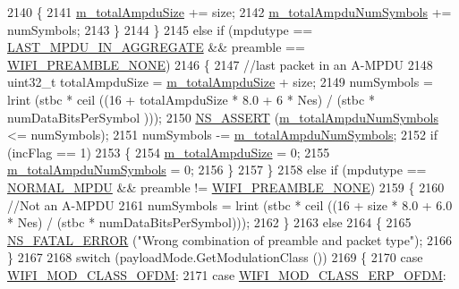 \begin{DoxyCode}
2140         \{
2141           \hyperlink{classns3_1_1WifiPhy_a33881bc9adbd2f0fa397fa6d5a44365f}{m\_totalAmpduSize} += size;
2142           \hyperlink{classns3_1_1WifiPhy_aef81821222be314fe60d1b1827b1397f}{m\_totalAmpduNumSymbols} += numSymbols;
2143         \}
2144     \}
2145   \textcolor{keywordflow}{else} \textcolor{keywordflow}{if} (mpdutype == \hyperlink{namespacens3_ae617d41bbd0c07fa58ee2306f687b055a00f5645550d1d4766ba10c4ac229b276}{LAST\_MPDU\_IN\_AGGREGATE} && preamble == 
      \hyperlink{group__wifi_gga5e94a56cb338a14ffbbb19c6a41251eba97c5c71995de5f28931200e6d5a38a66}{WIFI\_PREAMBLE\_NONE})
2146     \{
2147       \textcolor{comment}{//last packet in an A-MPDU}
2148       uint32\_t totalAmpduSize = \hyperlink{classns3_1_1WifiPhy_a33881bc9adbd2f0fa397fa6d5a44365f}{m\_totalAmpduSize} + size;
2149       numSymbols = lrint (stbc * ceil ((16 + totalAmpduSize * 8.0 + 6 * Nes) / (stbc * numDataBitsPerSymbol
      )));
2150       \hyperlink{assert_8h_a6dccdb0de9b252f60088ce281c49d052}{NS\_ASSERT} (\hyperlink{classns3_1_1WifiPhy_aef81821222be314fe60d1b1827b1397f}{m\_totalAmpduNumSymbols} <= numSymbols);
2151       numSymbols -= \hyperlink{classns3_1_1WifiPhy_aef81821222be314fe60d1b1827b1397f}{m\_totalAmpduNumSymbols};
2152       \textcolor{keywordflow}{if} (incFlag == 1)
2153         \{
2154           \hyperlink{classns3_1_1WifiPhy_a33881bc9adbd2f0fa397fa6d5a44365f}{m\_totalAmpduSize} = 0;
2155           \hyperlink{classns3_1_1WifiPhy_aef81821222be314fe60d1b1827b1397f}{m\_totalAmpduNumSymbols} = 0;
2156         \}
2157     \}
2158   \textcolor{keywordflow}{else} \textcolor{keywordflow}{if} (mpdutype == \hyperlink{namespacens3_ae617d41bbd0c07fa58ee2306f687b055a1fa7c2077d3b19b000b35004914f50eb}{NORMAL\_MPDU} && preamble != \hyperlink{group__wifi_gga5e94a56cb338a14ffbbb19c6a41251eba97c5c71995de5f28931200e6d5a38a66}{WIFI\_PREAMBLE\_NONE})
2159     \{
2160       \textcolor{comment}{//Not an A-MPDU}
2161       numSymbols = lrint (stbc * ceil ((16 + size * 8.0 + 6.0 * Nes) / (stbc * numDataBitsPerSymbol)));
2162     \}
2163   \textcolor{keywordflow}{else}
2164     \{
2165       \hyperlink{group__fatal_ga5131d5e3f75d7d4cbfd706ac456fdc85}{NS\_FATAL\_ERROR} (\textcolor{stringliteral}{"Wrong combination of preamble and packet type"});
2166     \}
2167 
2168   \textcolor{keywordflow}{switch} (payloadMode.GetModulationClass ())
2169     \{
2170     \textcolor{keywordflow}{case} \hyperlink{namespacens3_aa999e1221606a2b21b1eb33c2007c217a30a83a0318357c9611f09e6faadc8006}{WIFI\_MOD\_CLASS\_OFDM}:
2171     \textcolor{keywordflow}{case} \hyperlink{namespacens3_aa999e1221606a2b21b1eb33c2007c217afc1f5ef8d2c985f37a3224dd86ab014d}{WIFI\_MOD\_CLASS\_ERP\_OFDM}:

\end{DoxyCode}
